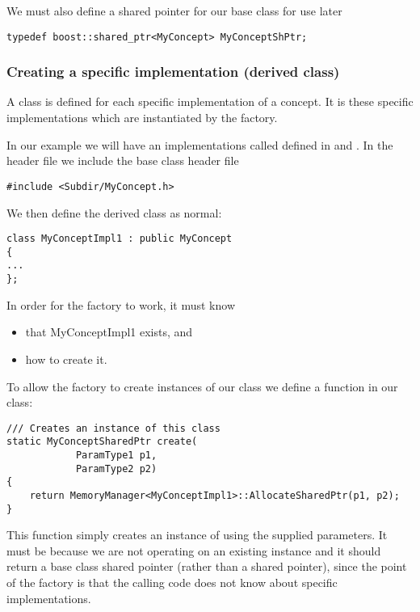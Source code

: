 We must also define a shared pointer for our base class for use later
\begin{lstlisting}[style=C++Style]
typedef boost::shared_ptr<MyConcept> MyConceptShPtr;
\end{lstlisting}

\subsubsection{Creating a specific implementation (derived class)}
A class is defined for each specific implementation of a concept. It is these
specific implementations which are instantiated by the factory.

In our example we will have an implementations called 
defined in  and . In the
header file we include the base class header file

\begin{lstlisting}[style=C++Style]
#include <Subdir/MyConcept.h>
\end{lstlisting}

We then define the derived class as normal:

\begin{lstlisting}[style=C++Style]
class MyConceptImpl1 : public MyConcept
{
...
};
\end{lstlisting}

In order for the factory to work, it must know
\begin{itemize}
\item that {{{MyConceptImpl1}}} exists, and
\item how to create it.
\end{itemize}

To allow the factory to create instances of our class we define a function in 
our class:
\begin{lstlisting}[style=C++Style]
/// Creates an instance of this class
static MyConceptSharedPtr create(
            ParamType1 p1,
            ParamType2 p2)
{
    return MemoryManager<MyConceptImpl1>::AllocateSharedPtr(p1, p2);
}
\end{lstlisting}
This function simply creates an instance of  using the
supplied parameters. It must be  because we are not operating on
an existing instance and it should return a base class shared pointer (rather 
than a  shared pointer), since the point of the factory
is that the calling code does not know about specific implementations.

